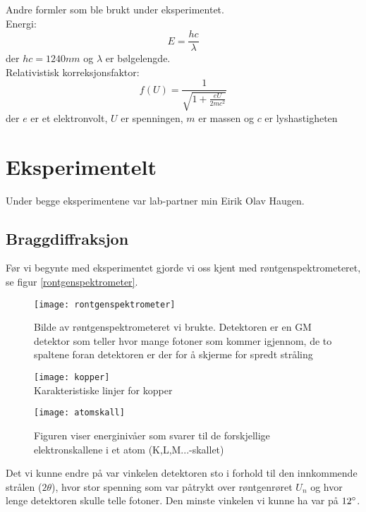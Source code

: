 \documentclass[norsk,a4paper,12pt]{article}
\begin{document}
Andre formler som ble brukt under eksperimentet.\\
Energi:
\begin{equation}
E = \frac{hc}{\lambda}
\label{energi}
\end{equation}
der $hc = 1240 nm$ og $\lambda$ er bølgelengde.\\
Relativistisk korreksjonsfaktor:
\begin{equation}
f(U) = \frac{1}{\sqrt{1 + \frac{eU}{2mc^2}}}
\label{kor}
\end{equation}
der $e$ er et elektronvolt, $U$ er spenningen, $m$ er massen og $c$ er lyshastigheten

\section{Eksperimentelt}

Under begge eksperimentene var lab-partner min Eirik Olav Haugen.
\subsection{Braggdiffraksjon}
Før vi begynte med eksperimentet gjorde vi oss kjent med røntgenspektrometeret, se figur \vref{rontgenspektrometer}. 
\begin{figure}
	\begin{center}
  	\texttt{[image: rontgenspektrometer]}\\
	\caption[Bilde av røntgenspektrometeret]{Bilde av røntgenspektrometeret vi brukte. Detektoren er en GM detektor som teller hvor mange fotoner som kommer igjennom, de to spaltene foran detektoren er der for å skjerme for spredt stråling}
	\label{rontgenspektrometer}
	\end{center}
\end{figure}
\begin{figure}
	\begin{minipage}{0.5\linewidth}
	\texttt{[image: kopper]}\\
	\caption[Karakterisktiske linjer for kopper]{Karakteristiske linjer for kopper}
	\label{kop}
	\end{minipage}
	\hspace{.5cm}
	\begin{minipage}{0.5\linewidth}
	\texttt{[image: atomskall]}\\
	\caption[Karateristisk røntgenstråling]{Figuren viser energinivåer som svarer til de forskjellige elektronskallene i et atom (K,L,M...-skallet)}
	\label{atomskall}
	\end{minipage}
\end{figure}
Det vi kunne endre på var vinkelen detektoren sto i forhold til den innkommende strålen ($2\theta$), hvor stor spenning som var påtrykt over røntgenrøret $U_n$ og hvor lenge detektoren skulle telle fotoner. Den minste vinkelen vi kunne ha var på $12\degree$.
 
\end{document}
